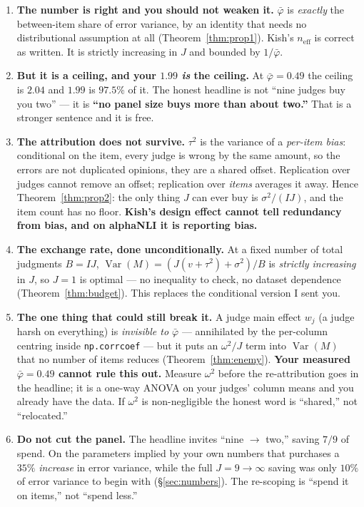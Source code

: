 \documentclass[11pt]{article}
\theoremstyle{plain}
\theoremstyle{definition}
\theoremstyle{remark}
\newcommand{\Var}{\operatorname{Var}}
\newcommand{\pb}{\bar{\varphi}}
\newcommand{\neff}{n_{\mathrm{eff}}}
\begin{document}
\begin{enumerate}
\item \textbf{The number is right and you should not weaken it.} $\pb$ is \emph{exactly}
the between-item share of error variance, by an identity that needs no distributional
assumption at all (Theorem~\ref{thm:prop1}). Kish's $\neff$ is correct as written. It is
strictly increasing in $J$ and bounded by $1/\pb$.

\item \textbf{But it is a ceiling, and your $1.99$ \emph{is} the ceiling.} At $\pb=0.49$ the
ceiling is $2.04$ and $1.99$ is $97.5\%$ of it. The honest headline is not ``nine judges buy
you two'' --- it is \textbf{``no panel size buys more than about two.''} That is a stronger
sentence and it is free.

\item \textbf{The attribution does not survive.} $\tau^2$ is the variance of a \emph{per-item
bias}: conditional on the item, every judge is wrong by the same amount, so the errors are not
duplicated opinions, they are a shared offset. Replication over judges cannot remove an offset;
replication over \emph{items} averages it away. Hence Theorem~\ref{thm:prop2}: the only thing
$J$ can ever buy is $\sigma^2/(IJ)$, and the item count has no floor. \textbf{Kish's design
effect cannot tell redundancy from bias, and on alphaNLI it is reporting bias.}

\item \textbf{The exchange rate, done unconditionally.} At a fixed number of total judgments
$B=IJ$, $\Var(M)=(J(v+\tau^2)+\sigma^2)/B$ is \emph{strictly increasing} in $J$, so $J=1$ is
optimal --- no inequality to check, no dataset dependence (Theorem~\ref{thm:budget}). This
replaces the conditional version I sent you.

\item \textbf{The one thing that could still break it.} A judge main effect $w_j$ (a judge
harsh on everything) is \emph{invisible to $\pb$} --- annihilated by the per-column centring
inside \texttt{np.corrcoef} --- but it puts an $\omega^2/J$ term into $\Var(M)$ that no number
of items reduces (Theorem~\ref{thm:enemy}). \textbf{Your measured $\pb=0.49$ cannot rule this
out.} Measure $\omega^2$ before the re-attribution goes in the headline; it is a one-way ANOVA
on your judges' column means and you already have the data. If $\omega^2$ is non-negligible the
honest word is ``shared,'' not ``relocated.''

\item \textbf{Do not cut the panel.} The headline invites ``nine $\to$ two,'' saving $7/9$ of
spend. On the parameters implied by your own numbers that purchases a $35\%$ \emph{increase} in
error variance, while the full $J=9\to\infty$ saving was only $10\%$ of error variance to begin
with (\S\ref{sec:numbers}). The re-scoping is ``spend it on items,'' not ``spend less.''
\end{enumerate}
\end{document}
